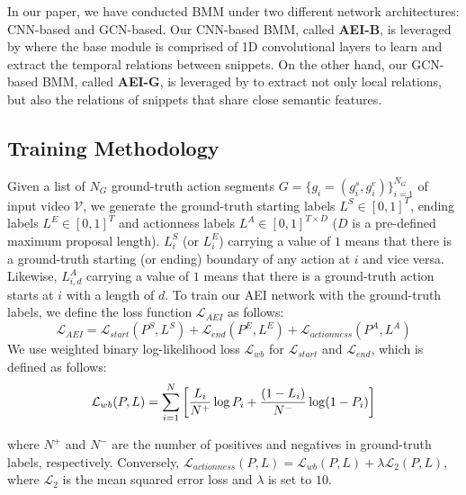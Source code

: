 \documentclass{bmvc2k}
\begin{document}
In our paper, we have conducted BMM under two different network architectures: CNN-based and GCN-based. Our CNN-based BMM, called \textbf{AEI-B}, is leveraged by \cite{bmn} where the base module is comprised of 1D convolutional layers to learn and extract the temporal relations between snippets. On the other hand, our GCN-based BMM, called \textbf{AEI-G}, is leveraged by \cite{xu2020gtad} to extract not only local relations, but also the relations of snippets that share close semantic features.










\subsection{Training Methodology}
\label{subsec:train_method}









Given a list of $N_G$ ground-truth action segments $G=\{g_i=(g^s_i, g^e_i)\}_{i=1}^{N_G}$ of input video $\mathcal{V}$, we generate the ground-truth starting labels $L^S \in [0,1]^T$, ending labels $L^E \in [0,1]^T$ and actionness labels $L^A \in [0,1]^{T\times D}$ ($D$ is a pre-defined maximum proposal length). $L^S_i$ (or $L^E_i$) carrying a value of $1$ means that there is a ground-truth starting (or ending) boundary of any action at $i$ and vice versa. Likewise, $L^A_{i,d}$ carrying a value of $1$ means that there is a ground-truth action starts at $i$ with a length of $d$.
To train our AEI network with the ground-truth labels, we define the loss function $\mathcal{L}_{AEI}$ as follows:
\begin{equation*}
    \mathcal{L}_{AEI} = \mathcal{L}_{start}(P^S, L^S) + \mathcal{L}_{end}(P^E,L^E) + \mathcal{L}_{actionness}(P^A,L^A)
\end{equation*}
We use weighted binary log-likelihood loss $\mathcal{L}_{wb}$ for $\mathcal{L}_{start}$ and $\mathcal{L}_{end}$, which is defined as follows:
\begin{equation}
\small
    \mathcal{L}_{wb}(P, L) =  \sum^{N}_{i=1}\left[\frac{L_i}{N^+}\log P_i + \frac{(1-L_i)}{N^-}\log (1-P_i)\right]
\label{eq:L_wb}
\end{equation}

where $N^+$ and $N^-$ are the number of positives and negatives in ground-truth labels, respectively. Conversely, $\mathcal{L}_{actionness}(P,L)=\mathcal{L}_{wb}(P,L)+\lambda \mathcal{L}_2(P,L)$, where $\mathcal{L}_2$ is the mean squared error loss and $\lambda$ is set to $10$.
\end{document}
